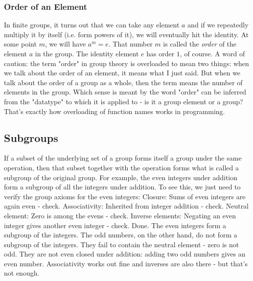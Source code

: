 









\subsubsection{Order of an Element}
In finite groups, it turns out that we can take any element $a$ and if we repeatedly multiply it by itself (i.e. form powers of it), we will eventually hit the identity. At some point $m$, we will have $a^m = e$. That number $m$ is called the \emph{order} of the element $a$ in the group. The identity element $e$ has order $1$, of course. A word of caution: the term "order" in group theory is overloaded to mean two things: when we talk about the order of an element, it means what I just said. But when we talk about the order of a group as a whole, then the term means the number of elements in the group. Which sense is meant by the word "order" can be inferred from the "datatype" to which it is applied to - is it a group element or a group? That's exactly how overloading of function names works in programming. 





\subsection{Subgroups}


If a subset of the underlying set of a group forms itself a group under the same operation, then that subset together with the operation forms what is called a subgroup of the original group. For example, the even integers under addition form a subgroup of all the integers under addition. To see this, we just need to verify the group axioms for the even integers: Closure: Sums of even integers are again even - check. Associativity: Inherited from integer addition - check. Neutral element: Zero is among the evens - check. Inverse elements: Negating an even integer gives another even integer - check. Done. The even integers form a subgroup of the integers. The odd numbers, on the other hand, do not form a subgroup of the integers. They fail to contain the neutral element - zero is not odd. They are not even closed under addition: adding two odd numbers gives an even number. Associativity works out fine and inverses are also there - but that's not enough. 

